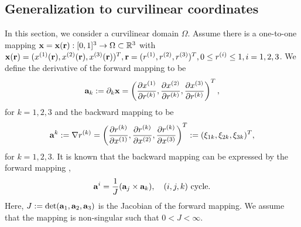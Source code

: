 \subsection{Generalization to curvilinear coordinates}

In this section, we consider a curvilinear domain $\Omega$. Assume there is a one-to-one mapping ${\bf x} = {\bf x}({\bf r}) : [0,1]^3 \rightarrow \Omega \subset \mathbb{R}^3$ with ${\bf x}({\bf r}) = (x^{(1)}({\bf r}),x^{(2)}({\bf r}),x^{(3)}({\bf r}))^T, {\bf r} = (r^{(1)},r^{(2)},r^{(3)})^T, 0\leq r^{(i)}\leq1, i = 1,2,3$. We define the derivative of the forward mapping to be 
\begin{equation}\label{elastic_eq_carte}
{\bf a}_k := \partial_k{\bf x} = \left(\frac{\partial x^{(1)}}{\partial r^{(k)}},\frac{\partial x^{(2)}}{\partial r^{(k)}},\frac{\partial x^{(3)}}{\partial r^{(k)}}\right)^T,
\end{equation}
for $k = 1,2,3$ and the backward mapping to be
\begin{equation*}
{\bf a}^k := \nabla r^{(k)} = \left(\frac{\partial r^{(k)}}{\partial x^{(1)}},\frac{\partial r^{(k)}}{\partial x^{(2)}},\frac{\partial r^{(k)}}{\partial x^{(3)}}\right)^T := (\xi_{1k},\xi_{2k},\xi_{3k})^T,
\end{equation*}
for $k = 1,2,3$. It is known that the backward mapping can be expressed by the forward mapping \cite{thompson1985numerical}, 
\begin{equation*}
{\bf a}^i = \frac{1}{J}({\bf a}_j\times{\bf a}_k), \ \ \ (i,j,k) \ \text{cycle}.
\end{equation*}
Here, $J:=\text{det}({\bf a}_1, {\bf a}_2, {\bf a}_3)$ is the Jacobian of the forward mapping. We assume that the mapping is non-singular such that  $0<J<\infty$.


